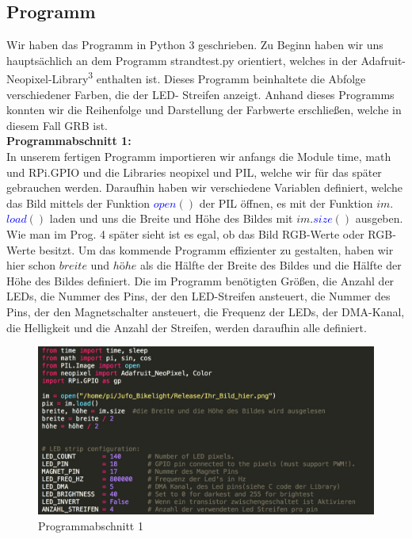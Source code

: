\documentclass [a4paper, 11pt] {article}
\begin{document}
\subsection{Programm}
Wir haben das Programm in Python 3 geschrieben. Zu Beginn haben wir uns hauptsächlich an dem Programm strandtest.py orientiert, welches in der Adafruit-Neopixel-Library\textsuperscript{3} enthalten ist. Dieses Programm beinhaltete die Abfolge verschiedener Farben, die der LED- Streifen anzeigt. Anhand dieses Programms konnten wir die Reihenfolge und Darstellung der Farbwerte erschließen, welche in diesem Fall GRB ist.
\\
\textbf{\large Programmabschnitt 1:}\\
In unserem fertigen Programm importieren wir anfangs die Module time, math und RPi.GPIO und die Libraries neopixel und PIL, welche wir für das später gebrauchen werden. Daraufhin haben wir verschiedene Variablen definiert, welche das Bild mittels der Funktion \textcolor{blue}{$open$}{$()$} der PIL öffnen, es mit der Funktion {$im.$}\textcolor{blue}{$load$}{$()$} laden und uns die Breite und Höhe des Bildes mit {$im.$}\textcolor{blue}{$size$}{$()$} ausgeben. Wie man im Prog. 4 später sieht ist es egal, ob das Bild RGB-Werte oder RGB\textalpha -Werte besitzt. Um das kommende Programm effizienter zu gestalten, haben wir hier schon {$breite$} und {$h\text{ö}he$} als die Hälfte der Breite des Bildes und die Hälfte der Höhe des Bildes definiert. Die im Programm benötigten Größen, die Anzahl der LEDs, die Nummer des Pins, der den LED-Streifen ansteuert, die Nummer des Pins, der den Magnetschalter ansteuert, die Frequenz der LEDs, der DMA-Kanal, die Helligkeit und die Anzahl der Streifen, werden daraufhin alle definiert.
\begin{figure}[H]
	\centering
	\includegraphics[width=16cm]{P1.png}
	\caption{Programmabschnitt 1}
	\label{P1}
\end{figure}
\end{document}
